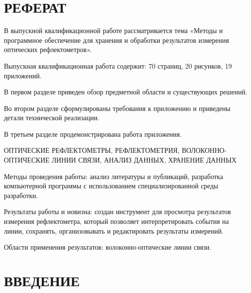 \documentclass[a4paper]{article}
\begin{document}


\section*{РЕФЕРАТ}
\thispagestyle{empty}

В выпускной квалификационной работе рассматривается тема «Методы и программное обеспечение для хранения и обработки результатов измерения оптических рефлектометров».

Выпускная квалификационная работа содержит: 70 страниц, 20 рисунков, 19 приложений.

В первом разделе приведен обзор предметной области и существующих решений.

Во втором разделе сформулированы требования к приложению и приведены детали технической реализации.

В третьем разделе продемонстрирована работа приложения.

ОПТИЧЕСКИЕ РЕФЛЕКТОМЕТРЫ, РЕФЛЕКТОМЕТРИЯ, ВОЛОКОННО-ОПТИЧЕСКИЕ ЛИНИИ СВЯЗИ, АНАЛИЗ ДАННЫХ, ХРАНЕНИЕ ДАННЫХ

Методы проведения работы: анализ литературы и публикаций, разработка компьютерной программы с использованием специализированной среды разработки.

Результаты работы и новизна: создан инструмент для просмотра результатов измерения рефлектометра, который позволяет интерпретировать события на линии, сохранять, организовывать и редактировать результаты измерений.

Области применения результатов: волоконно-оптические линии связи.

\newpage
\renewcommand{\contentsname}{СОДЕРЖАНИЕ}
\tableofcontents
{}

\newpage
\thispagestyle{empty}
\printnoidxglossary[
  title={ПЕРЕЧЕНЬ СОКРАЩЕНИЙ И ОБОЗНАЧЕНИЙ},
  type=\acronymtype
]

\newpage
\thispagestyle{empty}
\printnoidxglossary[
  title={СПИСОК ТЕРМИНОВ}
]

\newpage
\setcounter{page}{12}
\section*{ВВЕДЕНИЕ}

\end{document}
